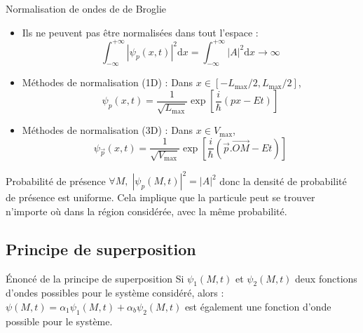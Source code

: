 \begin{Prop}{Normalisation de ondes de de Broglie}{}
\begin{itemize}

    \item Ils ne peuvent pas être normalisées dans tout l'espace :
      \[
        \displaystyle\int_{- \infty}^{+ \infty} | \psi_p(x,t) | ^{2} \mathrm{d} x = \int_{- \infty}^{+ \infty} |A| ^{2} \mathrm{d} x \to \infty
      \]
    \item Méthodes de normalisation (1D) : Dans $x \in [-L _{\max}/2, L _{\max}/2]$, 
    \[
      \boxed{\psi_p(x,t) = \frac{1}{\sqrt{L_{\max}}} \exp \left[ \frac{i}{\hbar}(p x -Et)\right]}
    \]
    \item Méthodes de normalisation (3D) : Dans $x \in V _{\max}$, 
    \[
      \psi_{\overrightarrow{p}}(x,t) = \frac{1}{\sqrt{V_{\max}}} \exp \left[ \frac{i}{\hbar}( \overrightarrow{p}. \overrightarrow{OM} -Et)\right]
    \]

\end{itemize}
\end{Prop}

\begin{Prop}{Probabilité de présence}{}
$\forall M, \;| \psi_p(M,t) | ^{2} = |A| ^{2}$ donc la densité de probabilité de présence est uniforme. Cela implique que la particule peut se trouver n'importe où dans la région considérée, avec la même probabilité.
\end{Prop}



\subsection{Principe de superposition} %

\begin{Prop}{Énoncé de la principe de superposition}{}
Si $\psi_1(M,t)$ et $\psi_2(M,t)$ deux fonctions d'ondes possibles pour le système considéré, alors : 
\center
$\psi(M,t) = \alpha_1 \psi_1(M,t) + \alpha_b \psi_2(M,t)$ est également une fonction d'onde possible pour le système.
\end{Prop}


